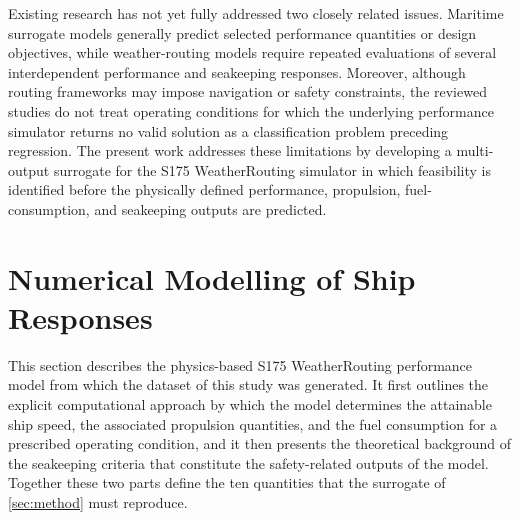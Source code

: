 \documentclass[final,5p,times,twocolumn,numbers]{elsarticle}
\begin{document}
Existing research has not yet fully addressed two closely related issues. Maritime surrogate models generally predict selected performance quantities or design objectives, while weather-routing models require repeated evaluations of several interdependent performance and seakeeping responses. Moreover, although routing frameworks may impose navigation or safety constraints, the reviewed studies do not treat operating conditions for which the underlying performance simulator returns no valid solution as a classification problem preceding regression. The present work addresses these limitations by developing a multi-output surrogate for the S175 WeatherRouting simulator in which feasibility is identified before the physically defined performance, propulsion, fuel-consumption, and seakeeping outputs are predicted.




\section{Numerical Modelling of Ship Responses}\label{sec:model}
This section describes the physics-based S175 WeatherRouting performance model from which the dataset of this study was generated. It first outlines the explicit computational approach by which the model determines the attainable ship speed, the associated propulsion quantities, and the fuel consumption for a prescribed operating condition, and it then presents the theoretical background of the seakeeping criteria that constitute the safety-related outputs of the model. Together these two parts define the ten quantities that the surrogate of \autoref{sec:method} must reproduce.
\end{document}
